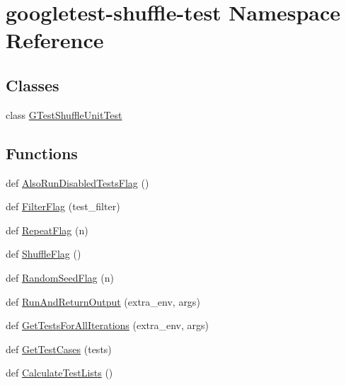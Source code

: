 \hypertarget{namespacegoogletest-shuffle-test}{}\section{googletest-\/shuffle-\/test Namespace Reference}
\label{namespacegoogletest-shuffle-test}
\subsection*{Classes}
\begin{DoxyCompactItemize}
\item 
class \mbox{\hyperlink{classgoogletest-shuffle-test_1_1GTestShuffleUnitTest}{G\+Test\+Shuffle\+Unit\+Test}}
\end{DoxyCompactItemize}
\subsection*{Functions}
\begin{DoxyCompactItemize}
\item 
def \mbox{\hyperlink{namespacegoogletest-shuffle-test_a83bb3105809a3bdc00e90954b138ee78}{Also\+Run\+Disabled\+Tests\+Flag}} ()
\item 
def \mbox{\hyperlink{namespacegoogletest-shuffle-test_a0bcd77f6d35c690b596bbddb8ee36765}{Filter\+Flag}} (test\+\_\+filter)
\item 
def \mbox{\hyperlink{namespacegoogletest-shuffle-test_a37b05a14223b814fc403db43f9287ae4}{Repeat\+Flag}} (n)
\item 
def \mbox{\hyperlink{namespacegoogletest-shuffle-test_a8f10ee7774fa361a058274410132c2da}{Shuffle\+Flag}} ()
\item 
def \mbox{\hyperlink{namespacegoogletest-shuffle-test_aa073a0449ab11c6cccb62249e70bb06f}{Random\+Seed\+Flag}} (n)
\item 
def \mbox{\hyperlink{namespacegoogletest-shuffle-test_a90f3ab31f08479d825e13816fbeea842}{Run\+And\+Return\+Output}} (extra\+\_\+env, args)
\item 
def \mbox{\hyperlink{namespacegoogletest-shuffle-test_a4b81c9525e71495e7f512575a3fe436e}{Get\+Tests\+For\+All\+Iterations}} (extra\+\_\+env, args)
\item 
def \mbox{\hyperlink{namespacegoogletest-shuffle-test_a81a570a6aadc23957a949f8740c3708d}{Get\+Test\+Cases}} (tests)
\item 
def \mbox{\hyperlink{namespacegoogletest-shuffle-test_ac6f7bc9bc4f37d2f4b4d0b34fbefca1c}{Calculate\+Test\+Lists}} ()
\end{DoxyCompactItemize}
